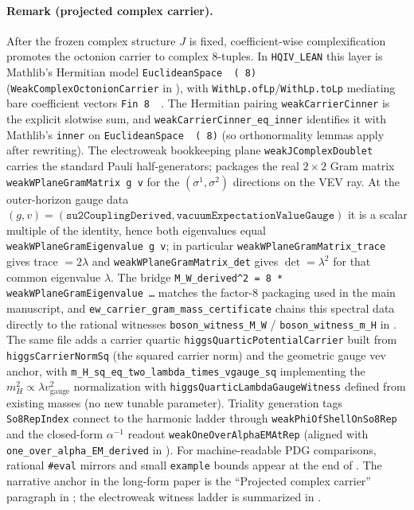 \documentclass[11pt]{article}
\begin{document}
\paragraph{Remark (projected complex carrier).}
After the frozen complex structure $J$ is fixed, coefficient-wise complexification promotes the octonion carrier to complex $8$-tuples.
In \texttt{HQIV\_LEAN} this layer is Mathlib's Hermitian model \texttt{EuclideanSpace\,\,(\,8)} (\texttt{WeakComplexOctonionCarrier} in ), with \texttt{WithLp.ofLp}/\texttt{WithLp.toLp} mediating bare coefficient vectors \texttt{Fin\,8\,\to\,}.
The Hermitian pairing \texttt{weakCarrierCinner} is the explicit slotwise sum, and \texttt{weakCarrierCinner\_eq\_inner} identifies it with Mathlib's \texttt{inner} on \texttt{EuclideanSpace\,\,(\,8)} (so orthonormality lemmas apply after rewriting).
The electroweak bookkeeping plane \texttt{weakJComplexDoublet} carries the standard Pauli half-generators;  packages the real $2\times2$ Gram matrix \texttt{weakWPlaneGramMatrix\,g\,v} for the $(\sigma^1,\sigma^2)$ directions on the VEV ray.
At the outer-horizon gauge data $(g,v)=(\texttt{su2CouplingDerived},\texttt{vacuumExpectationValueGauge})$ it is a scalar multiple of the identity, hence both eigenvalues equal \texttt{weakWPlaneGramEigenvalue\,g\,v}; in particular \texttt{weakWPlaneGramMatrix\_trace} gives trace $=2\lambda$ and \texttt{weakWPlaneGramMatrix\_det} gives $\det=\lambda^2$ for that common eigenvalue $\lambda$.
The bridge \texttt{M\_W\_derived\^{}2\,=\,8\,*\,weakWPlaneGramEigenvalue\,\dots} matches the factor-$8$ packaging used in the main manuscript, and \texttt{ew\_carrier\_gram\_mass\_certificate} chains this spectral data directly to the rational witnesses \texttt{boson\_witness\_M\_W} / \texttt{boson\_witness\_m\_H} in .
The same file adds a carrier quartic \texttt{higgsQuarticPotentialCarrier} built from \texttt{higgsCarrierNormSq} (the squared carrier norm) and the geometric gauge vev anchor, with \texttt{m\_H\_sq\_eq\_two\_lambda\_times\_vgauge\_sq} implementing the $m_H^2\propto \lambda v_{\mathrm{gauge}}^2$ normalization with \texttt{higgsQuarticLambdaGaugeWitness} defined from existing masses (no new tunable parameter).
Triality generation tags \texttt{So8RepIndex} connect to the harmonic ladder through \texttt{weakPhiOfShellOnSo8Rep} and the closed-form $\alpha^{-1}$ readout \texttt{weakOneOverAlphaEMAtRep} (aligned with \texttt{one\_over\_alpha\_EM\_derived} in ).
For machine-readable PDG comparisons, rational \texttt{\#eval} mirrors and small \texttt{example} bounds appear at the end of .
The narrative anchor in the long-form paper is the ``Projected complex carrier'' paragraph in ; the electroweak witness ladder is summarized in .
\end{document}
